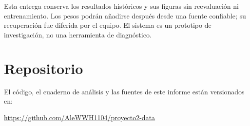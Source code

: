 \documentclass[11pt,letterpaper]{article}
\begin{document}
Esta entrega conserva los resultados históricos y sus figuras sin reevaluación ni entrenamiento.
Los pesos podrán añadirse después desde una fuente confiable; su recuperación fue diferida por
el equipo. El sistema es un prototipo de investigación, no una herramienta de diagnóstico.

\printbibliography[title={Referencias}]

\section*{Repositorio}

El código, el cuaderno de análisis y las fuentes de este informe están versionados en:

\begin{center}
\url{https://github.com/AleWWH1104/proyecto2-data}
\end{center}
\end{document}

